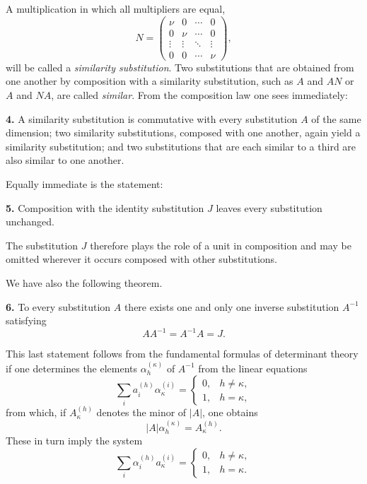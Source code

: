 \documentclass[11pt,a4paper]{book}
\begin{document}
\medskip
A multiplication in which all multipliers are equal,
\[
N=
\begin{pmatrix}
\nu & 0 & \cdots & 0\\
0 & \nu & \cdots & 0\\
\vdots & \vdots & \ddots & \vdots\\
0 & 0 & \cdots & \nu
\end{pmatrix},
\]
will be called a \emph{similarity substitution}. Two substitutions that are obtained from one another by composition with a similarity substitution, such as \(A\) and \(AN\) or \(A\) and \(NA\), are called \emph{similar}. From the composition law one sees immediately:

\medskip
\noindent\textbf{4.}
A similarity substitution is commutative with every substitution \(A\) of the same dimension; two similarity substitutions, composed with one another, again yield a similarity substitution; and two substitutions that are each similar to a third are also similar to one another.

\medskip
Equally immediate is the statement:

\medskip
\noindent\textbf{5.}
Composition with the identity substitution \(J\) leaves every substitution unchanged.

\medskip
The substitution \(J\) therefore plays the role of a unit in composition and may be omitted wherever it occurs composed with other substitutions.

We have also the following theorem.

\medskip
\noindent\textbf{6.}
To every substitution \(A\) there exists one and only one inverse substitution \(A^{-1}\) satisfying
\[
AA^{-1}=A^{-1}A=J.
\tag{15}
\]

\medskip
This last statement follows from the fundamental formulas of determinant theory if one determines the elements \(\alpha^{(\kappa)}_h\) of \(A^{-1}\) from the linear equations
\[
\sum_i a^{(h)}_i\alpha^{(i)}_\kappa=
\begin{cases}
0,& h\ne \kappa,\\
1,& h=\kappa,
\end{cases}
\tag{16}
\]
from which, if \(A^{(h)}_\kappa\) denotes the minor of \(|A|\), one obtains
\[
|A|\alpha^{(\kappa)}_h=A^{(h)}_\kappa.
\tag{17}
\]
These in turn imply the system
\[
\sum_i \alpha^{(h)}_i a^{(i)}_\kappa=
\begin{cases}
0,& h\ne \kappa,\\
1,& h=\kappa.
\end{cases}
\tag{18}
\]
\end{document}
